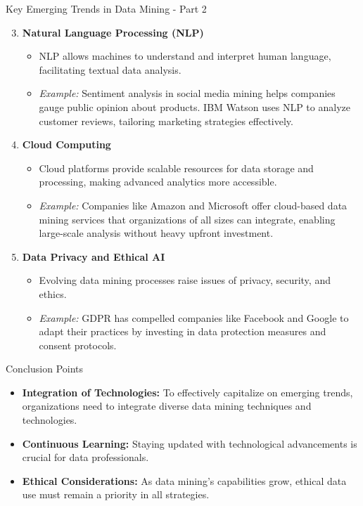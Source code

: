 \documentclass[aspectratio=169]{beamer}
\begin{document}
\begin{frame}[fragile]{Key Emerging Trends in Data Mining - Part 2}
    \begin{enumerate}
        \setcounter{enumi}{2}
        \item \textbf{Natural Language Processing (NLP)}
            \begin{itemize}
                \item NLP allows machines to understand and interpret human language, facilitating textual data analysis.
                \item \textit{Example:} Sentiment analysis in social media mining helps companies gauge public opinion about products. IBM Watson uses NLP to analyze customer reviews, tailoring marketing strategies effectively.
            \end{itemize}
        
        \item \textbf{Cloud Computing}
            \begin{itemize}
                \item Cloud platforms provide scalable resources for data storage and processing, making advanced analytics more accessible.
                \item \textit{Example:} Companies like Amazon and Microsoft offer cloud-based data mining services that organizations of all sizes can integrate, enabling large-scale analysis without heavy upfront investment.
            \end{itemize}
        
        \item \textbf{Data Privacy and Ethical AI}
            \begin{itemize}
                \item Evolving data mining processes raise issues of privacy, security, and ethics.
                \item \textit{Example:} GDPR has compelled companies like Facebook and Google to adapt their practices by investing in data protection measures and consent protocols.
            \end{itemize}
    \end{enumerate}
\end{frame}

\begin{frame}[fragile]{Conclusion Points}
    \begin{itemize}
        \item \textbf{Integration of Technologies:} To effectively capitalize on emerging trends, organizations need to integrate diverse data mining techniques and technologies.
        \item \textbf{Continuous Learning:} Staying updated with technological advancements is crucial for data professionals.
        \item \textbf{Ethical Considerations:} As data mining's capabilities grow, ethical data use must remain a priority in all strategies.
    \end{itemize}
\end{frame}
\end{document}
